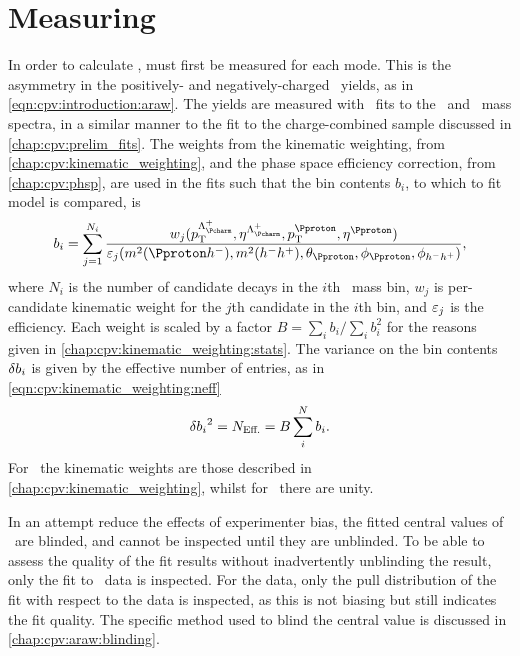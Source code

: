\chapter{Measuring \texorpdfstring{\ARaw}{ARaw}}
\label{chap:cpv:araw}

In order to calculate \dACP, \ARaw must first be measured for each mode.
This is the asymmetry in the positively- and negatively-charged \PLambdac\ 
yields, as in \cref{eqn:cpv:introduction:araw}.
The yields are measured with \chisq\ fits to the \PLambdac\ and \APLambdac\ 
mass spectra, in a similar manner to the fit to the charge-combined sample 
discussed in \cref{chap:cpv:prelim_fits}.
The weights from the kinematic weighting, from 
\cref{chap:cpv:kinematic_weighting}, and the phase space efficiency correction, 
from \cref{chap:cpv:phsp}, are used in the fits such that the bin contents 
$b_{i}$, to which to fit model is compared, is
\begin{equation}
  b_{i} = \sum_{j = 1}^{N_{i}} \frac{%
    w_{j}(\pT^{\PLambdac}, \Eta^{\PLambdac},
          \pT^{\Pproton}, \Eta^{\Pproton})
  }{%
    \eff_{j}(\msqphm, \msqhh, \thetap, \phip, \phihh)
  },
  \label{eqn:cpv:araw:total_weights}
\end{equation}
where $N_{i}$ is the number of candidate decays in the $i$th \phh\ mass bin, 
$w_{j}$ is per-candidate kinematic weight for the $j$th candidate in the $i$th 
bin, and $\varepsilon_{j}$ is the efficiency.
Each weight is scaled by a factor $B = \sum_{i} b_{i}/\sum_{i} b_{i}^{2}$ for 
the reasons given in \cref{chap:cpv:kinematic_weighting:stats}.
The variance on the bin contents $\delta{b_{i}}$ is given by the effective number 
of entries, as in \cref{eqn:cpv:kinematic_weighting:neff}
\begin{equation}
  \delta{b_{i}}^{2} = N_{\text{Eff.}} = B\sum_{i}^{N} b_{i}.
\end{equation}
For \ppipi\ the kinematic weights are those described in 
\cref{chap:cpv:kinematic_weighting}, whilst for \pKK\ there are unity.

In an attempt reduce the effects of experimenter bias, the fitted central 
values of \ARaw\ are blinded, and cannot be inspected until they are unblinded.
To be able to assess the quality of the fit results without inadvertently 
unblinding the result, only the fit to \PLambdac\ data is inspected.
For the \APLambdac data, only the pull distribution of the fit with respect to 
the data is inspected, as this is not biasing but still indicates the fit 
quality.
The specific method used to blind the central value is discussed in 
\cref{chap:cpv:araw:blinding}.

